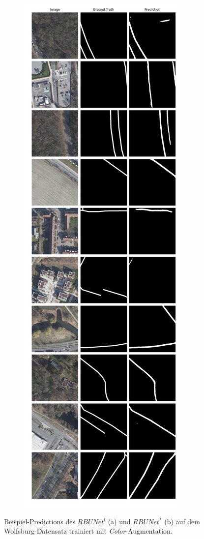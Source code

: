 \begin{figure}[h]
\begin{subfigure}{.4\textwidth}
		\caption{}
	\end{subfigure}
	\begin{subfigure}{.4\textwidth}
		\centering
		\includegraphics[width=1.\textwidth]{Bilder/wolfsburg-color-samples/rbunet-s.png}
		\caption{}
	\end{subfigure}
	\caption{Beispiel-Predictions des $RBUNet^l$ (a) und $RBUNet^*$ (b) auf dem Wolfsburg-Datensatz trainiert mit \textit{Color}-Augmentation.}
	\label{fig:wolfsburg-samples-rbunet-l-rbunet-s-color}
\end{figure}


